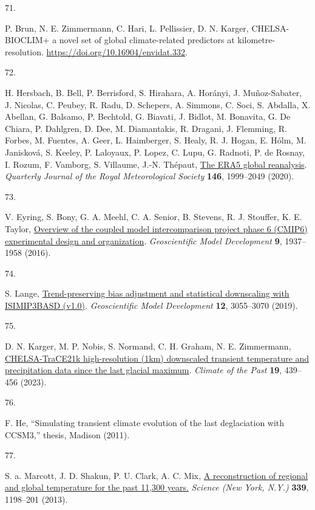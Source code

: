 \documentclass[
  letterpaper,
  DIV=11,
  numbers=noendperiod]{scrartcl}
\newlength{\cslhangindent}
\newlength{\csllabelwidth}
\newenvironment{CSLReferences}[2] %
 {\begin{list}{}{%
  \setlength{\itemindent}{0pt}
  \setlength{\leftmargin}{0pt}
  \setlength{\parsep}{0pt}
  \ifodd #1
   \setlength{\leftmargin}{\cslhangindent}
   \setlength{\itemindent}{-1\cslhangindent}
  \fi
  \setlength{\itemsep}{#2\baselineskip}}}
 {\end{list}}
\newcommand{\CSLLeftMargin}[1]{\parbox[t]{\csllabelwidth}{\strut#1\strut}}
\newcommand{\CSLRightInline}[1]{\parbox[t]{\linewidth - \csllabelwidth}{\strut#1\strut}}
\begin{document}
\begin{CSLReferences}{0}{1}
\CSLLeftMargin{71. }%
\CSLRightInline{P. Brun, N. E. Zimmermann, C. Hari, L. Pellissier, D. N.
Karger, CHELSA-BIOCLIM+ a novel set of global climate-related predictors
at kilometre-resolution. \url{https://doi.org/10.16904/envidat.332}.}

\CSLLeftMargin{72. }%
\CSLRightInline{H. Hersbach, B. Bell, P. Berrisford, S. Hirahara, A.
Horányi, J. Muñoz-Sabater, J. Nicolas, C. Peubey, R. Radu, D. Schepers,
A. Simmons, C. Soci, S. Abdalla, X. Abellan, G. Balsamo, P. Bechtold, G.
Biavati, J. Bidlot, M. Bonavita, G. De Chiara, P. Dahlgren, D. Dee, M.
Diamantakis, R. Dragani, J. Flemming, R. Forbes, M. Fuentes, A. Geer, L.
Haimberger, S. Healy, R. J. Hogan, E. Hólm, M. Janisková, S. Keeley, P.
Laloyaux, P. Lopez, C. Lupu, G. Radnoti, P. de Rosnay, I. Rozum, F.
Vamborg, S. Villaume, J.-N. Thépaut,
\href{https://doi.org/10.1002/qj.3803}{The ERA5 global reanalysis}.
\emph{Quarterly Journal of the Royal Meteorological Society}
\textbf{146}, 1999--2049 (2020).}

\CSLLeftMargin{73. }%
\CSLRightInline{V. Eyring, S. Bony, G. A. Meehl, C. A. Senior, B.
Stevens, R. J. Stouffer, K. E. Taylor,
\href{https://doi.org/10.5194/gmd-9-1937-2016}{Overview of the coupled
model intercomparison project phase 6 (CMIP6) experimental design and
organization}. \emph{Geoscientific Model Development} \textbf{9},
1937--1958 (2016).}

\CSLLeftMargin{74. }%
\CSLRightInline{S. Lange,
\href{https://doi.org/10.5194/gmd-12-3055-2019}{Trend-preserving bias
adjustment and statistical downscaling with ISIMIP3BASD (v1.0)}.
\emph{Geoscientific Model Development} \textbf{12}, 3055--3070 (2019).}

\CSLLeftMargin{75. }%
\CSLRightInline{D. N. Karger, M. P. Nobis, S. Normand, C. H. Graham, N.
E. Zimmermann,
\href{https://doi.org/10.5194/cp-19-439-2023}{CHELSA-TraCE21k
{\textendash} high-resolution (1km) downscaled transient temperature and
precipitation data since the last glacial maximum}. \emph{Climate of the
Past} \textbf{19}, 439--456 (2023).}

\CSLLeftMargin{76. }%
\CSLRightInline{F. He, {``Simulating transient climate evolution of the
last deglaciation with CCSM3,''} thesis, Madison (2011).}

\CSLLeftMargin{77. }%
\CSLRightInline{S. a. Marcott, J. D. Shakun, P. U. Clark, A. C. Mix,
\href{https://doi.org/10.1126/science.1228026}{A reconstruction of
regional and global temperature for the past 11,300 years.}
\emph{Science (New York, N.Y.)} \textbf{339}, 1198--201 (2013).}


\end{CSLReferences}
\end{document}
